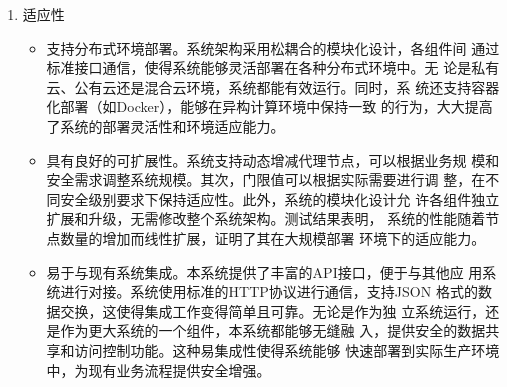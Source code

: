 \begin{enumerate}
\begin{itemize}
		      \item 支持高效的数据共享和授权。通过代理重加密技术，数据拥有者可
		            以快速授权其他用户访问已加密的数据，而无需解密原始数据或共
		            享自己的私钥。这种授权过程简单高效，只需生成适当的重加密密
		            钥并分发给代理节点。同时，系统支持批量授权和权限管理，能够
		            在大规模数据共享场景中保持高效率，满足现代数据交换平台的需求。

		      \item 具有良好的系统响应性能。通过混合加密机制（KEM/DEM），系统在处
		            理大量数据时能够保持高效率。其次，异步处理机制使系统能够并
		            行处理多个请求，提高了整体吞吐量。第三，系统采用轻量级的通
		            信协议和数据格式，减少了网络传输开销。最后，数据库操作和存
		            储策略也经过优化，确保了快速的数据访问和管理。这些措施共同
		            确保了系统在各种工作负载下都能保持良好的响应性能。

		      \item 计算效率优于传统方案。传统方案通常需要多次加解密操作或复杂的
		            密钥管理机制，导致系统性能下降。而本系统通过代理重加密技术，
		            实现了"一次加密，多次授权"的高效模式，显著减少了重复加解密的
		            需求。性能测试结果表明，即使在高频率数据访问和权限变更的场景
		            下，系统仍能保持稳定高效的性能，计算开销远低于传统方案。
	      \end{itemize}

	\item 适应性
	      \begin{itemize}
		      \item 支持分布式环境部署。系统架构采用松耦合的模块化设计，各组件间
		            通过标准接口通信，使得系统能够灵活部署在各种分布式环境中。无
		            论是私有云、公有云还是混合云环境，系统都能有效运行。同时，系
		            统还支持容器化部署（如Docker），能够在异构计算环境中保持一致
		            的行为，大大提高了系统的部署灵活性和环境适应能力。

		      \item 具有良好的可扩展性。系统支持动态增减代理节点，可以根据业务规
		            模和安全需求调整系统规模。其次，门限值可以根据实际需要进行调
		            整，在不同安全级别要求下保持适应性。此外，系统的模块化设计允
		            许各组件独立扩展和升级，无需修改整个系统架构。测试结果表明，
		            系统的性能随着节点数量的增加而线性扩展，证明了其在大规模部署
		            环境下的适应能力。

		      \item 易于与现有系统集成。本系统提供了丰富的API接口，便于与其他应
		            用系统进行对接。系统使用标准的HTTP协议进行通信，支持JSON
		            格式的数据交换，这使得集成工作变得简单且可靠。无论是作为独
		            立系统运行，还是作为更大系统的一个组件，本系统都能够无缝融
		            入，提供安全的数据共享和访问控制功能。这种易集成性使得系统能够
		            快速部署到实际生产环境中，为现有业务流程提供安全增强。


\end{itemize}
\end{enumerate}
